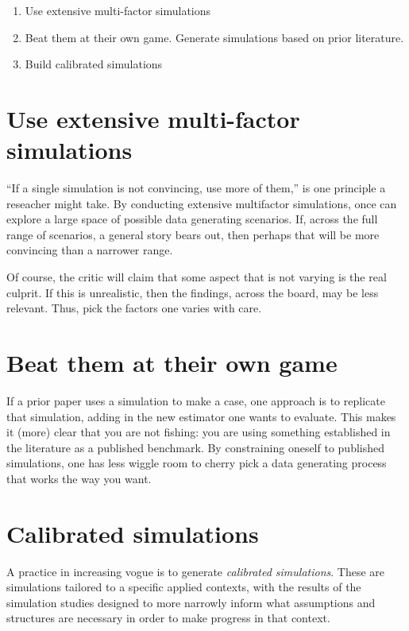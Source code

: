 \documentclass[
]{book}
\providecommand{\tightlist}{%
  \setlength{\itemsep}{0pt}\setlength{\parskip}{0pt}}
\begin{document}
\begin{enumerate}
\def\labelenumi{\arabic{enumi}.}
\tightlist
\item
  Use extensive multi-factor simulations
\item
  Beat them at their own game. Generate simulations based on prior literature.
\item
  Build calibrated simulations
\end{enumerate}

\section{Use extensive multi-factor simulations}\label{use-extensive-multi-factor-simulations}

``If a single simulation is not convincing, use more of them,'' is one principle a reseacher might take.
By conducting extensive multifactor simulations, once can explore a large space of possible data generating scenarios.
If, across the full range of scenarios, a general story bears out, then perhaps that will be more convincing than a narrower range.

Of course, the critic will claim that some aspect that is not varying is the real culprit.
If this is unrealistic, then the findings, across the board, may be less relevant.
Thus, pick the factors one varies with care.

\section{Beat them at their own game}\label{beat-them-at-their-own-game}

If a prior paper uses a simulation to make a case, one approach is to replicate that simulation, adding in the new estimator one wants to evaluate.
This makes it (more) clear that you are not fishing: you are using something established in the literature as a published benchmark.
By constraining oneself to published simulations, one has less wiggle room to cherry pick a data generating process that works the way you want.

\section{Calibrated simulations}\label{calibrated-simulations}

A practice in increasing vogue is to generate \emph{calibrated simulations}.
These are simulations tailored to a specific applied contexts, with the results of the simulation studies designed to more narrowly inform what assumptions and structures are necessary in order to make progress in that context.
\end{document}
